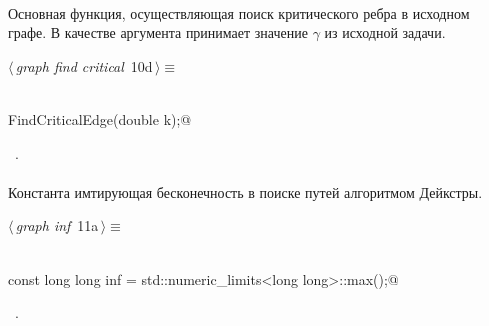 \documentclass[12pt]{article}
\begin{document}
\paragraph{}
Основная функция, осуществляющая поиск критического ребра в исходном графе. В качестве аргумента принимает значение $\gamma$
из исходной задачи.
\begin{flushleft} \small
\begin{minipage}{\linewidth}\label{scrap12}\raggedright\small
{} $\langle\,${\itshape graph find critical}\nobreak\ {\footnotesize {10d}}$\,\rangle\equiv$
\vspace{-1ex}
\begin{list}{}{} \item
\mbox{}\verb@@\\
\mbox{}\verb@void FindCriticalEdge(double k);@\\
\mbox{}\verb@@{\NWsep}
\end{list}
\vspace{-1.5ex}
\footnotesize
\begin{list}{}{\setlength{\itemsep}{-\parsep}\setlength{\itemindent}{-\leftmargin}}
\item \NWtxtMacroRefIn\ .

\item{}
\end{list}
\end{minipage}\vspace{4ex}
\end{flushleft}
\paragraph{}
Константа имтирующая бесконечность в поиске путей алгоритмом Дейкстры.
\begin{flushleft} \small
\begin{minipage}{\linewidth}\label{scrap13}\raggedright\small
{} $\langle\,${\itshape graph inf}\nobreak\ {\footnotesize {11a}}$\,\rangle\equiv$
\vspace{-1ex}
\begin{list}{}{} \item
\mbox{}\verb@@\\
\mbox{}\verb@static const long long inf = std::numeric_limits<long long>::max();@\\
\mbox{}\verb@@{\NWsep}
\end{list}
\vspace{-1.5ex}
\footnotesize
\begin{list}{}{\setlength{\itemsep}{-\parsep}\setlength{\itemindent}{-\leftmargin}}
\item \NWtxtMacroRefIn\ .

\item{}
\end{list}
\end{minipage}\vspace{4ex}
\end{flushleft}
\end{document}
